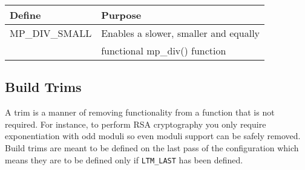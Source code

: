 \documentclass[synpaper]{book}
\begin{document}
\begin{small}
\begin{center}
\begin{tabular}{|l|l|}
\hline \textbf{Define} & \textbf{Purpose} \\
\hline MP\_DIV\_SMALL & Enables a slower, smaller and equally \\
                          & functional mp\_div() function \\
\hline
\end{tabular}
\end{center}
\end{small}

\subsection{Build Trims}
A trim is a manner of removing functionality from a function that is not required.  For instance, to perform
RSA cryptography you only require exponentiation with odd moduli so even moduli support can be safely removed.
Build trims are meant to be defined on the last pass of the configuration which means they are to be defined
only if \texttt{LTM\_LAST} has been defined.
\end{document}
